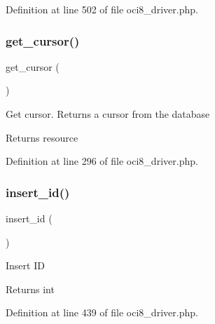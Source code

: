 Definition at line 502 of file oci8\+\_\+driver.\+php.

\mbox{\label{class_c_i___d_b__oci8__driver_aaf8b241dc9ed2d812e965dc882ed9ea3}} 
\subsubsection{\texorpdfstring{get\_cursor()}{get\_cursor()}}
{\footnotesize\ttfamily get\+\_\+cursor (\begin{DoxyParamCaption}{ }\end{DoxyParamCaption})}

Get cursor. Returns a cursor from the database

\begin{DoxyReturn}{Returns}
resource 
\end{DoxyReturn}


Definition at line 296 of file oci8\+\_\+driver.\+php.

\mbox{\label{class_c_i___d_b__oci8__driver_a933f2cde8dc7f87875e257d0a4902e99}} 
\subsubsection{\texorpdfstring{insert\_id()}{insert\_id()}}
{\footnotesize\ttfamily insert\+\_\+id (\begin{DoxyParamCaption}{ }\end{DoxyParamCaption})}

Insert ID

\begin{DoxyReturn}{Returns}
int 
\end{DoxyReturn}


Definition at line 439 of file oci8\+\_\+driver.\+php.

\mbox{\label{class_c_i___d_b__oci8__driver_adb2007e6a64069385b285c77480d87b7}} 

